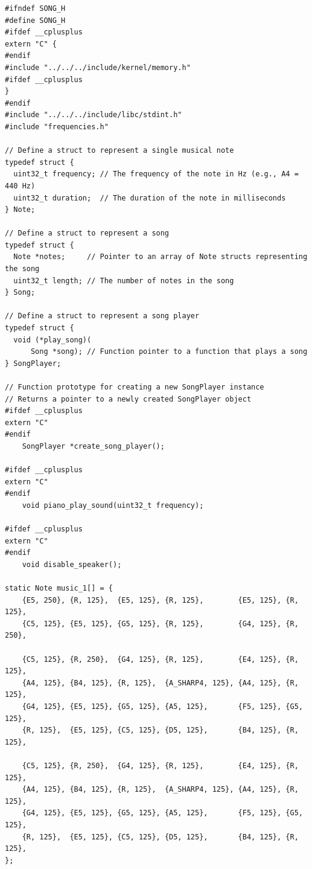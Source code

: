 \documentclass[../main.tex]{subfiles}
\begin{document}
\label{lst:song_h}
\begin{verbatim}
#ifndef SONG_H
#define SONG_H
#ifdef __cplusplus
extern "C" {
#endif
#include "../../../include/kernel/memory.h"
#ifdef __cplusplus
}
#endif
#include "../../../include/libc/stdint.h"
#include "frequencies.h"

// Define a struct to represent a single musical note
typedef struct {
  uint32_t frequency; // The frequency of the note in Hz (e.g., A4 = 440 Hz)
  uint32_t duration;  // The duration of the note in milliseconds
} Note;

// Define a struct to represent a song
typedef struct {
  Note *notes;     // Pointer to an array of Note structs representing the song
  uint32_t length; // The number of notes in the song
} Song;

// Define a struct to represent a song player
typedef struct {
  void (*play_song)(
      Song *song); // Function pointer to a function that plays a song
} SongPlayer;

// Function prototype for creating a new SongPlayer instance
// Returns a pointer to a newly created SongPlayer object
#ifdef __cplusplus
extern "C"
#endif
    SongPlayer *create_song_player();

#ifdef __cplusplus
extern "C"
#endif
    void piano_play_sound(uint32_t frequency);

#ifdef __cplusplus
extern "C"
#endif
    void disable_speaker();

static Note music_1[] = {
    {E5, 250}, {R, 125},  {E5, 125}, {R, 125},        {E5, 125}, {R, 125},
    {C5, 125}, {E5, 125}, {G5, 125}, {R, 125},        {G4, 125}, {R, 250},

    {C5, 125}, {R, 250},  {G4, 125}, {R, 125},        {E4, 125}, {R, 125},
    {A4, 125}, {B4, 125}, {R, 125},  {A_SHARP4, 125}, {A4, 125}, {R, 125},
    {G4, 125}, {E5, 125}, {G5, 125}, {A5, 125},       {F5, 125}, {G5, 125},
    {R, 125},  {E5, 125}, {C5, 125}, {D5, 125},       {B4, 125}, {R, 125},

    {C5, 125}, {R, 250},  {G4, 125}, {R, 125},        {E4, 125}, {R, 125},
    {A4, 125}, {B4, 125}, {R, 125},  {A_SHARP4, 125}, {A4, 125}, {R, 125},
    {G4, 125}, {E5, 125}, {G5, 125}, {A5, 125},       {F5, 125}, {G5, 125},
    {R, 125},  {E5, 125}, {C5, 125}, {D5, 125},       {B4, 125}, {R, 125},
};


\end{verbatim}
\end{document}
